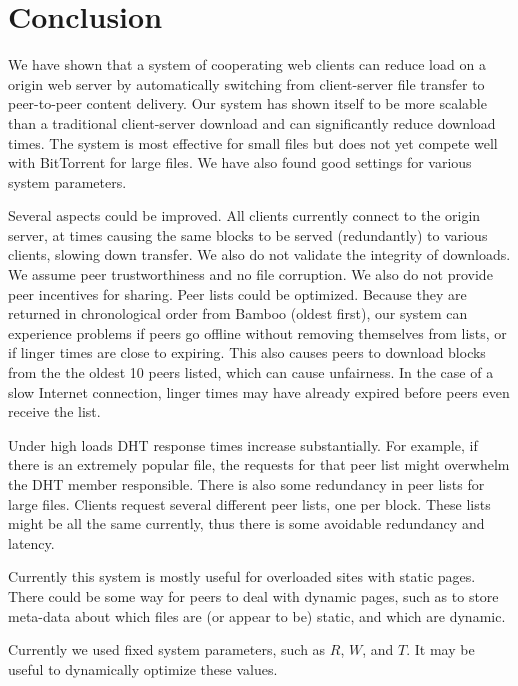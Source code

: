 \chapter{Conclusion}

We have shown that a system of cooperating web clients can reduce load on a origin web server by automatically switching
from client-server file transfer to peer-to-peer content delivery. Our system has shown itself to be more scalable 
than a traditional client-server download and can significantly
reduce download times.  The system is most effective for small files but does not yet compete well with
BitTorrent for large files.  We have also found good settings for various system parameters.

Several aspects could be improved.  All clients currently connect to the origin
server, at times causing the same blocks to be served (redundantly) to various clients, slowing down transfer.
We also do not validate the integrity of downloads.  We assume peer trustworthiness and no file corruption.  We also do not provide peer incentives for sharing.
Peer lists could be optimized.  Because they are returned in chronological order from Bamboo (oldest first), our system can experience problems if peers
go offline without removing themselves from lists, or if linger times are close to expiring.  This also causes peers to download blocks 
from the the oldest 10 peers listed, which can cause unfairness. In the case of a slow Internet connection, linger times may have
already expired before peers even receive the list.

Under high loads DHT response times increase substantially.  For example, if there is an extremely popular file, the 
requests for that peer list might overwhelm the DHT member responsible.  There is also some redundancy in peer lists for large files.  
Clients request several different peer lists, one per block.  These lists might be all the same currently, thus
there is some avoidable redundancy and latency.

Currently this system is mostly useful for overloaded sites with static pages.  There could be some way for peers to deal with dynamic pages, such as to
store meta-data about which files are (or appear to be) static, and which are dynamic.  

Currently we used fixed system parameters, such as $R$, $W$, and $T$.  It may be useful to dynamically optimize these values.